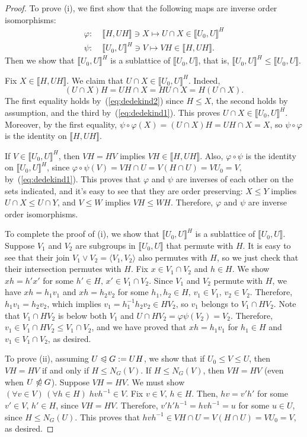 \documentclass{gen-j-l}
\newcommand{\lb}{\ensuremath{\llbracket}}
\newcommand{\rb}{\ensuremath{\rrbracket}}
\newcommand{\<}{\ensuremath{\langle}}
\renewcommand{\>}{\ensuremath{\rangle}}
\theoremstyle{plain}
\theoremstyle{definition}
\newcounter{claim}
\theoremstyle{remark}
\numberwithin{theorem}{section}
\numberwithin{claim}{section}
\numberwithin{equation}{section}
\numberwithin{conjecture}{section}
\renewcommand{\leq}{\ensuremath{\leqslant}}
\newcommand{\subnormal}{\ensuremath{\trianglelefteqslant}}
\newcommand{\notsubnormal}{\ensuremath{\ntrianglelefteqslant}}
\newcommand{\join}{\ensuremath{\vee}}
\newcommand{\2}{\ensuremath{\mathbf{2}}}
\newcommand{\3}{\ensuremath{\mathbf{3}}}
\renewcommand{\phi}{\ensuremath{\varphi}}
\begin{document}
\begin{proof}
To prove (i), we first show that the following maps are inverse order isomorphisms:
\begin{align}
\label{eq:inverse-isos}
\phi: \;& \lb H, UH \rb \ni X \mapsto U\cap X \in \lb U_0, U \rb^H\\
\psi: \;& \lb U_0, U \rb^H \ni V \mapsto VH \in \lb H, UH \rb.\nonumber
\end{align}
Then we show that $\lb U_0, U \rb^H$ is a sublattice of $\lb U_0,U \rb$, that is, 
$\lb U_0, U \rb^H\leq \lb U_0,U \rb$.

Fix $X\in \lb H, UH \rb$. We claim that $U\cap X \in \lb U_0, U \rb^H$. Indeed,
\[
    (U\cap X) H = UH \cap X=
               HU \cap X
                = H(U \cap X).
\]
The first equality holds by~(\ref{eq:dedekind2}) since $H\leq X$, the second holds
by assumption, and the third by~(\ref{eq:dedekind1}).
  This proves $U\cap X \in \lb U_0, U \rb^H$.  Moreover, by the first equality,
$\psi \circ \phi (X) = (U\cap X)H =UH \cap X = X$,
so $\psi \circ \phi$ is the identity on $\lb H, UH \rb$.

If $V\in \lb U_0, U \rb^H$, then $VH = HV$ implies $VH \in \lb H, UH \rb$. Also, $\phi \circ
\psi$ is the identity on $\lb U_0, U \rb^H$, since $\phi \circ \psi(V)= VH \cap U =
V(H\cap U)= VU_0 = V$, by~(\ref{eq:dedekind1}). 
This proves that $\phi$ and $\psi$ are inverses of each other on the sets indicated, and
it's easy to see that they are order preserving:
$X\leq Y$ implies $U\cap X \leq U\cap Y$, and $V\leq W$ implies $VH \leq WH$.
Therefore, $\phi$ and $\psi$ are inverse order isomorphisms.

To complete the proof of (i), we show that
$\lb U_0, U \rb^H$ is a sublattice of $\lb U_0, U \rb$.  Suppose $V_1$ and $V_2$ are
subgroups in $\lb U_0, U \rb$ that permute with $H$.  
It is easy to see that their join $V_1 \join V_2 = \<V_1, V_2\>$ also permutes
with $H$, so we just check that their intersection permutes with $H$.  Fix
$x \in V_1 \cap V_2$ and $h\in H$.  We show $xh = h'x'$ for some $h'\in H, \, x'
\in V_1\cap V_2$. Since $V_1$ and $V_2$ permute with $H$, we have $xh = h_1 v_1$
and $xh = h_2 v_2$ for some $h_1, h_2\in H, \, v_1 \in V_1, \, v_2 \in V_2$.
Therefore, $h_1 v_1 = h_2 v_2$, which implies $v_1 = h_1^{-1}h_2 v_2 \in HV_2$,
so $v_1$ belongs to $V_1 \cap HV_2$. Note that $V_1 \cap HV_2$ is below both $V_1$ and
$U\cap HV_2 = \phi \psi(V_2) = V_2$.  Therefore, $v_1 \in V_1 \cap HV_2 \leq V_1
\cap V_2$, and we have proved that $xh = h_1 v_1$ for $h_1\in H$ and $v_1 \in
V_1\cap V_2$, as desired. 

To prove (ii), assuming $U\subnormal G:=UH$, we show that if $U_0 \leq V \leq U$,
then $VH = HV$ if and only if $H\leq N_G(V)$.
If $H\leq N_G(V)$, then $VH = HV$ (even when $U \notsubnormal G$).
Suppose $VH = HV$.  We must show $(\forall v\in V)\, (\forall h\in H)\; hvh^{-1}\in
V$.  Fix $v\in V, \, h\in H$.  Then, $hv = v'h'$ for some $v'\in V,\, h'\in H$, since
$VH = HV$.  Therefore, $v' h' h^{-1} = hvh^{-1} = u$ for some $u\in U$, since
$H\leq N_G(U)$. This proves that $hvh^{-1}\in VH\cap U = V(H\cap U) = VU_0 = V$, as
desired.
\end{proof}
\end{document}
